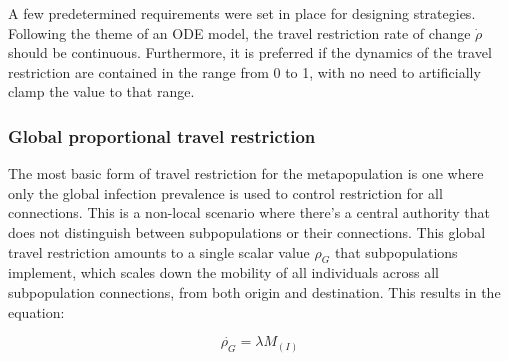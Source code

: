 
A few predetermined requirements were set in place for designing strategies. Following the theme of an ODE model, the travel restriction rate of change $\dot \rho$ should be continuous. Furthermore, it is preferred if the dynamics of the travel restriction are contained in the range from 0 to 1, with no need to artificially clamp the value to that range.

\subsubsection{Global proportional travel restriction}
The most basic form of travel restriction for the metapopulation is one where only the global infection prevalence is used to control restriction for all connections. This is a non-local scenario where there's a central authority that does not distinguish between subpopulations or their connections. This global travel restriction amounts to a single scalar value $\rho_G$ that subpopulations implement, which scales down the mobility of all individuals across all subpopulation connections, from both origin and destination. This results in the equation:

\begin{equation}
    \dot{\rho_G} = \lambda M_{(I)}
\end{equation}

